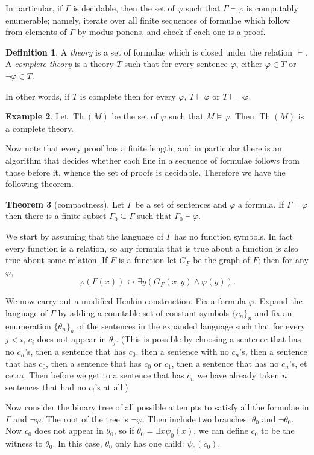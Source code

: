 \documentclass[12pt]{report}
\renewcommand{\iff}{\leftrightarrow}
\newcommand{\proves}{\vdash}
\DeclareMathOperator{\Th}{Th}
\newcommand{\dfn}[1]{\emph{#1}\index{#1}}
\theoremstyle{definition}
\newtheorem{theorem}{Theorem}[chapter]
\newtheorem{definition}[theorem]{Definition}
\newtheorem{example}[theorem]{Example}
\begin{document}
In particular, if $\Gamma$ is decidable, then the set of $\varphi$ such that $\Gamma \proves \varphi$ is computably enumerable; namely, iterate over all finite sequences of formulae which follow from elements of $\Gamma$ by modus ponens, and check if each one is a proof.
\begin{definition}
A \dfn{theory} is a set of formulae which is closed under the relation $\proves$. A \dfn{complete theory} is a theory $T$ such that for every sentence $\varphi$, either $\varphi \in T$ or $\neg\varphi \in T$.
\end{definition}
In other words, if $T$ is complete then for every $\varphi$, $T \proves \varphi$ or $T \proves \neg \varphi$.
\begin{example}
Let $\Th(M)$ be the set of $\varphi$ such that $M \models \varphi$. Then $\Th(M)$ is a complete theory.
\end{example}
Now note that every proof has a finite length, and in particular there is an algorithm that decides whether each line in a sequence of formulae follows from those before it, whence the set of proofs is decidable. Therefore we have the following theorem.
\begin{theorem}[compactness]
Let $\Gamma$ be a set of sentences and $\varphi$ a formula. If $\Gamma \proves \varphi$ then there is a finite subset $\Gamma_0 \subseteq \Gamma$ such that $\Gamma_0 \proves \varphi$.
\end{theorem}
We start by assuming that the language of $\Gamma$ has no function symbols. In fact every function is a relation, so any formula that is true about a function is also true about some relation. If $F$ is a function let $G_F$ be the graph of $F$; then for any $\varphi$,
$$\varphi(F(x)) \iff \exists y(G_F(x, y) \wedge \varphi(y)).$$

We now carry out a modified Henkin construction. Fix a formula $\varphi$. Expand the language of $\Gamma$ by adding a countable set of constant symbols $\{c_n\}_n$ and fix an enumeration $\{\theta_n\}_n$ of the sentences in the expanded language such that for every $j < i$, $c_i$ does not appear in $\theta_j$. (This is possible by choosing a sentence that has no $c_n$'s, then a sentence that has $c_0$, then a sentence with no $c_n$'s, then a sentence that has $c_0$, then a sentence that has $c_0$ or $c_1$, then a sentence that has no $c_n$'s, et cetra. Then before we get to a sentence that has $c_n$ we have already taken $n$ sentences that had no $c_i$'s at all.)

Now consider the binary tree of all possible attempts to satisfy all the formulae in $\Gamma$ and $\neg \varphi$. The root of the tree is $\neg\varphi$. Then include two branches: $\theta_0$ and $\neg\theta_0$. Now $c_0$ does not appear in $\theta_0$, so if $\theta_0 = \exists x \psi_0(x)$, we can define $c_0$ to be the witness to $\theta_0$. In this case, $\theta_0$ only has one child: $\psi_0(c_0)$.
\end{document}
